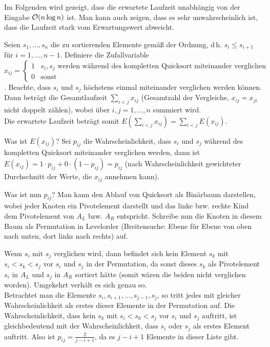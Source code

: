 \linie

Im Folgenden wird gezeigt, dass die erwartete Laufzeit unabhängig von der
Eingabe $\mathcal{O}(n \log n)$ ist.
Man kann auch zeigen, dass es sehr unwahrscheinlich ist, dass die Laufzeit
stark vom Erwartungswert abweicht.

\begin{Beweis}
    Seien $s_1, \dotsc, s_n$ die zu sortierenden Elemente gemäß der Ordnung,
    d\,h. $s_i \le s_{i+1}$ für $i = 1, \dotsc, n - 1$.
    Definiere die Zufallvariable
    {\tiny $x_{ij} = \begin{cases}1 & s_i, s_j
    \text{ werden während des kompletten Quicksort miteinander verglichen} \\
    0 & \text{sonst}\end{cases}$}.
    Beachte, dass $s_i$ und $s_j$ höchstens einmal miteinander verglichen
    werden können.
    Dann beträgt die Gesamtlaufzeit $\sum_{i < j} x_{ij}$ (Gesamtzahl der
    Vergleiche, $x_{ij} = x_{ji}$ nicht doppelt zählen), wobei über
    $i, j = 1, \dotsc, n$ summiert wird. \\
    Die erwartete Laufzeit beträgt somit $E(\sum_{i < j} x_{ij})
    = \sum_{i < j} E(x_{ij})$.

    Was ist $E(x_{ij})$?
    Sei $p_{ij}$ die Wahrscheinlichkeit, dass $s_i$ und $s_j$
    während des kompletten Quicksort miteinander verglichen werden,
    dann ist $E(x_{ij}) = 1 \cdot p_{ij} + 0 \cdot (1 - p_{ij}) = p_{ij}$
    (nach Wahrscheinlichkeit gewichteter Durchschnitt der Werte, die $x_{ij}$
    annehmen kann).

    Was ist nun $p_{ij}$?
    Man kann den Ablauf von Quicksort als Binärbaum darstellen, wobei jeder
    Knoten ein Pivotelement darstellt und das linke bzw. rechte Kind dem
    Pivotelement von $A_L$ bzw. $A_R$ entspricht.
    Schreibe nun die Knoten in diesem Baum als Permutation in Levelorder
    (Breitensuche: Ebene für Ebene von oben nach unten, dort links nach rechts)
    auf.

    \pagebreak

    Wenn $s_i$ mit $s_j$ verglichen wird, dann befindet sich kein Element $s_k$
    mit $s_i < s_k < s_j$ vor $s_i$ und $s_j$ in der Permutation, da
    sonst dieses $s_k$ als Pivotelement $s_i$ in $A_L$ und $s_j$ in $A_R$
    sortiert hätte (somit wären die beiden nicht verglichen worden).
    Umgekehrt verhält es sich genau so. \\
    Betrachtet man die Elemente $s_i, s_{i+1}, \dotsc, s_{j-1}, s_j$, so tritt
    jedes mit gleicher Wahrscheinlichkeit als erstes dieser Elemente in der
    Permutation auf.
    Die Wahrscheinlichkeit, dass kein $s_k$ mit $s_i < s_k < s_j$ vor $s_i$ und
    $s_j$ auftritt, ist gleichbedeutend mit der Wahrscheinlichkeit, dass
    $s_i$ oder $s_j$ als erstes Element auftritt.
    Also ist $p_{ij} = \frac{2}{j - i + 1}$, da es $j - i + 1$ Elemente in
    dieser Liste gibt.


\end{Beweis}
